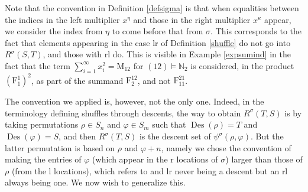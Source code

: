 \documentclass{article}
\theoremstyle{definition}
\begin{document}
\medskip

Note that the convention in Definition \ref{defsigma} is that when equalities between the indices in the left multiplier $x^{\eta}$ and those in the right multiplier $x^{\kappa}$ appear, we consider the index from $\eta$ to come before that from $\sigma$. This corresponds to the fact that elements appearing in the case lr of Definition \ref{shuffle} do not go into $R^{\sigma}(S,T)$, and those with rl do. This is visible in Example \ref{expsumind} in the fact that the term $\sum_{i=1}^{\infty}x_{i}^{2}=\mathrm{M}_{12}$ for $(12)\vDash\mathbb{N}_{2}$ is considered, in the product $(\mathrm{F}_{1}^{1})^{2}$, as part of the summand $\mathrm{F}_{2}^{12}$, and not $\mathrm{F}_{11}^{21}$.

The convention we applied is, however, not the only one. Indeed, in the terminology defining shuffles through descents, the way to obtain $R^{\sigma}(T,S)$ is by taking permutations $\rho \in S_{n}$ and $\varphi \in S_{m}$ such that $\operatorname{Des}(\rho)=T$ and $\operatorname{Des}(\varphi)=S$, and then $R^{\sigma}(T,S)$ is the descent set of $\psi^{\sigma}(\rho,\varphi)$. But the latter permutation is based on $\rho$ and $\varphi+n$, namely we chose the convention of making the entries of $\varphi$ (which appear in the r locations of $\sigma$) larger than those of $\rho$ (from the l locations), which refers to and lr never being a descent but an rl always being one. We now wish to generalize this.
\end{document}
